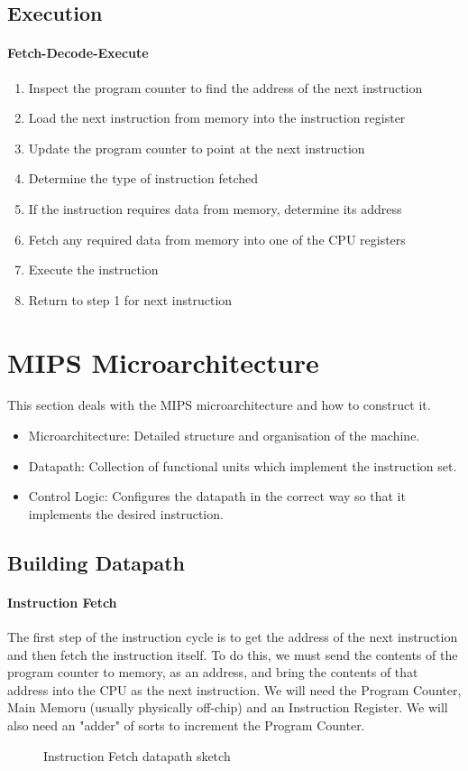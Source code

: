\subsection{Execution}
\paragraph{Fetch-Decode-Execute}
\begin{enumerate}
	\item Inspect the program counter to find the address of the next instruction
	\item Load the next instruction from memory into the instruction register
	\item Update the program counter to point at the next instruction
	\item Determine the type of instruction fetched
	\item If the instruction requires data from memory, determine its address
	\item Fetch any required data from memory into one of the CPU registers
	\item Execute the instruction
	\item Return to step 1 for next instruction
\end{enumerate}

\section{MIPS Microarchitecture}
This section deals with the MIPS microarchitecture and how to construct it.
\begin{itemize}
	\item Microarchitecture: Detailed structure and organisation of the machine.
	\item Datapath: Collection of functional units which implement the instruction set.
	\item Control Logic: Configures the datapath in the correct way so that it implements the desired instruction.
\end{itemize}
\subsection{Building Datapath}
\paragraph{Instruction Fetch}
The first step of the instruction cycle is to get the address of the next instruction and then fetch the instruction itself. To do this, we must send the contents of the program counter to memory, as an address, and bring the contents of that address into the CPU as the next instruction. We will need the Program Counter, Main Memoru (usually physically off-chip) and an Instruction Register. We will also need an "adder" of sorts to increment the Program Counter. 
\begin{figure}[!htb]
	\caption{\label{fig:mips1} Instruction Fetch datapath sketch}
\end{figure}

